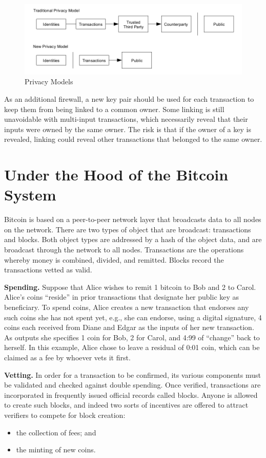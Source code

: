 \begin{figure}[ht!]
\centering
\includegraphics[trim = 0mm 0mm 0mm 0mm, width=120mm]{images/traditional_privacy_model}
\caption{Privacy Models}
\end{figure}

As an additional firewall, a new key pair should be used for each transaction to keep them from being linked to a common owner. Some linking is still unavoidable with multi-input transactions, which necessarily reveal that their inputs were owned by the same owner. The risk is that if the owner of a key is revealed, linking could reveal other transactions that belonged to the same owner.

\chapter{Under the Hood of the Bitcoin System}

Bitcoin is based on a peer-to-peer network layer that broadcasts data to all nodes on
the network. There are two types of object that are broadcast: transactions and blocks.
Both object types are addressed by a hash of the object data, and are broadcast through
the network to all nodes. Transactions are the operations whereby money is combined,
divided, and remitted. Blocks record the transactions vetted as valid.

\textbf{Spending.} Suppose that Alice wishes to remit 1 bitcoin to Bob and 2 to Carol. Alice’s
coins “reside” in prior transactions that designate her public key as beneficiary. To spend
coins, Alice creates a new transaction that endorses any such coins she has not spent
yet, e.g., she can endorse, using a digital signature, 4 coins each received from Diane
and Edgar as the inputs of her new transaction. As outputs she specifies 1 coin for Bob,
2 for Carol, and 4:99 of “change” back to herself. In this example, Alice chose to leave
a residual of 0:01 coin, which can be claimed as a fee by whoever vets it first.

\textbf{Vetting.} In order for a transaction to be confirmed, its various components must be
validated and checked against double spending. Once verified, transactions are incorporated
in frequently issued official records called blocks. Anyone is allowed to create
such blocks, and indeed two sorts of incentives are offered to attract verifiers to compete
for block creation: 
\begin{itemize}
	\item the collection of fees; and 
	\item the minting of new coins.
\end{itemize}

